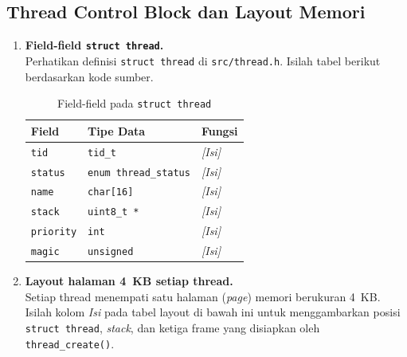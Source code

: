 \subsection{Thread Control Block dan Layout Memori}

\begin{enumerate}

    \item \textbf{Field-field \texttt{struct thread}.}\\
    Perhatikan definisi \texttt{struct thread} di \texttt{src/thread.h}.
    Isilah tabel berikut berdasarkan kode sumber.

    \begin{table}[!ht]
    \caption{Field-field pada \texttt{struct thread}}
    \label{tab:h04-struct-thread}
    \centering
    \begin{tabulary}{\linewidth}{|L|L|L|}
    \hline
    \textbf{Field} & \textbf{Tipe Data} & \textbf{Fungsi} \\
    \hline
    \texttt{tid}      & \texttt{tid\_t}              & \textit{[Isi]} \\
    \hline
    \texttt{status}   & \texttt{enum thread\_status} & \textit{[Isi]} \\
    \hline
    \texttt{name}     & \texttt{char[16]}            & \textit{[Isi]} \\
    \hline
    \texttt{stack}    & \texttt{uint8\_t *}          & \textit{[Isi]} \\
    \hline
    \texttt{priority} & \texttt{int}                 & \textit{[Isi]} \\
    \hline
    \texttt{magic}    & \texttt{unsigned}            & \textit{[Isi]} \\
    \hline
    \end{tabulary}
    \end{table}

    \item \textbf{Layout halaman 4~KB setiap thread.}\\
    Setiap thread menempati satu halaman (\textit{page}) memori berukuran
    4~KB. Isilah kolom \textit{Isi} pada tabel layout di bawah ini
    untuk menggambarkan posisi \texttt{struct thread}, \textit{stack},
    dan ketiga frame yang disiapkan oleh \texttt{thread\_create()}.


\end{enumerate}
